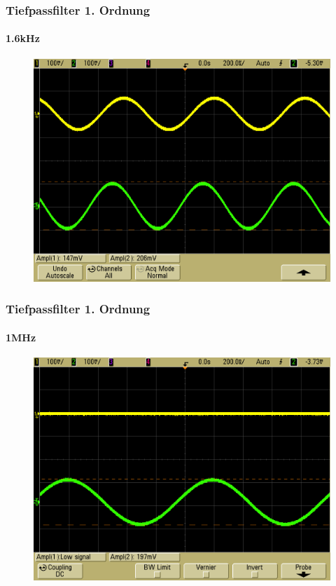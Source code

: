 \begin{frame}
    \frametitle{Tiefpassfilter 1. Ordnung}
    \framesubtitle{1.6kHz}
     \begin{figure}[H]
     \begin{center}
             \includegraphics[scale=0.2]{./img/2a_Tief_1_6_kHz.png}
     \end{center}
     \end{figure}
\end{frame}
\begin{frame}
    \frametitle{Tiefpassfilter 1. Ordnung}
    \framesubtitle{1MHz}
     \begin{figure}[H]
     \begin{center}
             \includegraphics[scale=0.2]{./img/2a_tief_1MHz.png}
     \end{center}
     \end{figure}
\end{frame}
